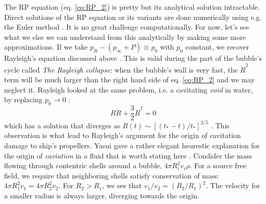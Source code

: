 \documentclass[rmp,aps,nofootinbib,superscriptaddress,floatfix]{revtex4-2}
\begin{document}
The RP equation (eq. \ref{eq:RP_2}) is pretty but its analytical solution intractable. Direct solutions of the RP equation or its variants are done numerically using e.g. the Euler method \cite{yasui2018acoustic,yasui2015dynamics}. It is no great challenge computationally. For now, let's see what we else we can understand from this analytically by making some more approximations. If we take $p_B-(p_\infty+P) \equiv p_0$ with $p_0$ constant, we recover Rayleigh's equation discussed above \cite{rayleigh1917pressure,plesset1949dynamics,prosperetti1999old,brenner2002single}. This is valid during the part of the bubble's cycle called \emph{The Rayleigh collapse}: when the bubble's wall is very fast, the $\dot{R}^2$ term will be much larger than the right hand side of eq. \ref{eq:RP_2} and we may neglect it. Rayleigh looked at the same problem, i.e. a cavitating \emph{void} in water, by replacing $p_0\rightarrow 0$ \cite{brenner2002single,rayleigh1917pressure}:
\begin{equation}
    R\ddot{R}+\frac{3}{2}\dot{R}^2=0
    \label{eq:Rayleigh}
\end{equation}
which has a solution that diverges as $R(t)\sim\left[(t_*-t)/t_* \right]^{2/5}$ \cite{brenner2002single}. This observation is what lead to Rayleigh's argument for the origin of cavitation damage to ship's propellers. Yasui gave a rather elegant heurestic explanation for the origin of \emph{caviation} in a fluid that is worth stating here \cite{yasui2018acoustic}. Condider the mass flowing through contentric shells around a bubble, $4\pi R_i^2 v_i \rho$. For a source free field, we require that neighboring shells satisfy conservation of mass: $4\pi R_1^2 v_1 = 4\pi R_2^2 v_2$. For $R_2 > R_1$, we see that $v_1/v_2 = \left(R_2/R_1\right)^2$. The velocity for a smaller radius is always larger, diverging towards the origin.
\end{document}
